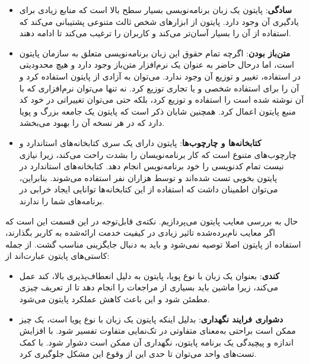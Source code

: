 \begin{itemize}

\item \textbf{سادگی}: پایتون یک زبان برنامه‌نویسی بسیار سطح بالا است که منابع زیادی برای یادگیری آن وجود دارد. پایتون از ابزارهای شخص ثالث متنوعی پشتیبانی می‌کند که استفاده از آن را بسیار آسان‌تر می‌کند و کاربران را ترغیب می‌کند تا ادامه دهند\cite{srinath2017python, sharma2020python}.

\item \textbf{متن‌باز بودن}: اگرچه تمام حقوق این زبان برنامه‌نویسی متعلق به سازمان پایتون است، اما درحال‌ حاضر به عنوان یک نرم‌افزار متن‌باز وجود دارد و هیچ محدودیتی در استفاده، تغییر و توزیع آن وجود ندارد. می‌توان به آزادی از پایتون استفاده کرد و آن را برای استفاده شخصی و یا تجاری توزیع کرد. نه تنها می‌توان نرم‌افزاری که با آن نوشته شده است را استفاده و توزیع کرد، بلکه حتی می‌توان تغییراتی در خود کد منبع پایتون اعمال کرد. همچنین شایان ذکر است که پایتون یک جامعه بزرگ و پویا دارد که در هر نسخه آن را بهبود می‌بخشد\cite{srinath2017python, sharma2020python}.

\item \textbf{کتابخانه‌ها و چارچوب‌ها}: پایتون دارای یک سری کتابخانه‌های استاندارد و چارچوب‌های متنوع است که کار برنامه‌نویسان را بشدت راحت می‌کند، زیرا نیازی نیست تمام کدنویسی را خود برنامه‌نویس انجام دهد. کتابخانه‌های استاندارد در پایتون بخوبی تست شده‌اند و توسط هزاران نفر استفاده می‌شوند. بنابراین، می‌توان اطمینان داشت که استفاده از این کتابخانه‌ها توانایی ایجاد خرابی در برنامه‌های شما را ندارند\cite{srinath2017python, sharma2020python}.

\end{itemize}

حال به بررسی معایب پایتون می‌پردازیم. نکته‌ی قابل‌توجه در این قسمت این است که اگر معایب نام‌برده‌شده تاثیر زیادی در کیفیت خدمت ارائه‌شده به کاربر بگذارند، استفاده از پایتون اصلا توصیه نمی‌شود و باید به دنبال جایگزینی مناسب گشت. از جمله کاستی‌های پایتون عبارت‌اند از:

\begin{itemize}

\item \textbf{کندی}: بعنوان یک زبان با نوع پویا، پایتون به دلیل انعطاف‌پذیری بالا، کند عمل می‌کند، زیرا ماشین باید بسیاری از مراجعات را انجام دهد تا از تعریف چیزی مطمئن شود و این باعث کاهش عملکرد پایتون می‌شود\cite{srinath2017python, sharma2020python}.

\item \textbf{دشواری فرایند نگهداری}: بدلیل اینکه پایتون یک زبان با نوع پویا است، یک چیز ممکن است براحتی به‌معنای متفاوتی در تک‌نمایی متفاوت تفسیر شود. با افزایش اندازه و پیچیدگی یک برنامه پایتون، نگهداری آن ممکن است دشوار شود. با کمک تست‌های واحد می‌توان تا حدی این از وقوع این مشکل جلوگیری کرد\cite{srinath2017python, sharma2020python}.

\end{itemize}

